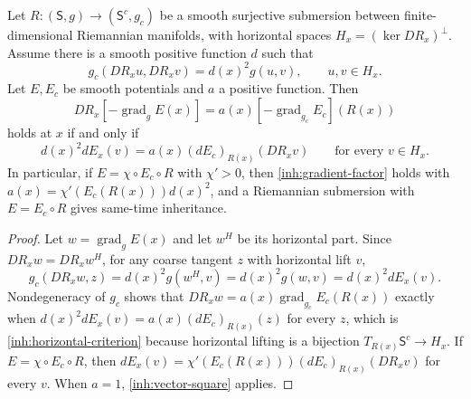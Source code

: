 Let $R:(\mathsf S,g)\to(\mathsf S^c,g_c)$ be a smooth surjective
submersion between finite-dimensional Riemannian manifolds, with horizontal
spaces $H_x=(\ker DR_x)^\perp$. Assume there is a smooth positive function
$d$ such that
\begin{equation}
 g_c(DR_xu,DR_xv)=d(x)^2g(u,v),
 \qquad u,v\in H_x.
 \label{inh:horizontal-conformality}
\end{equation}
Let $E,E_c$ be smooth potentials and $a$ a positive function. Then
\begin{equation}
 DR_x[-\operatorname{grad}_gE(x)]
 =a(x)[-\operatorname{grad}_{g_c}E_c](R(x))
 \label{inh:gradient-factor}
\end{equation}
holds at $x$ if and only if
\begin{equation}
 d(x)^2dE_x(v)=a(x)(dE_c)_{R(x)}(DR_xv)
 \qquad\text{for every }v\in H_x.
 \label{inh:horizontal-criterion}
\end{equation}
In particular, if $E=\chi\circ E_c\circ R$ with $\chi'>0$, then
\cref{inh:gradient-factor} holds with
$a(x)=\chi'(E_c(R(x)))d(x)^2$, and a Riemannian submersion with
$E=E_c\circ R$ gives same-time inheritance.
\begin{proof}
Let $w=\operatorname{grad}_gE(x)$ and let $w^H$ be its horizontal part.
Since $DR_xw=DR_xw^H$, for any coarse tangent $z$ with horizontal lift $v$,
\begin{equation}
 g_c(DR_xw,z)
 =d(x)^2g(w^H,v)
 =d(x)^2g(w,v)
 =d(x)^2dE_x(v).
\end{equation}
Nondegeneracy of $g_c$ shows that $DR_xw=a(x)\operatorname{grad}_{g_c}E_c(R(x))$
exactly when $d(x)^2dE_x(v)=a(x)(dE_c)_{R(x)}(z)$ for every $z$, which is
\cref{inh:horizontal-criterion} because horizontal lifting is a bijection
$T_{R(x)}\mathsf S^c\to H_x$. If $E=\chi\circ E_c\circ R$, then
$dE_x(v)=\chi'(E_c(R(x)))(dE_c)_{R(x)}(DR_xv)$ for every $v$. When $a=1$,
\cref{inh:vector-square} applies.
\end{proof}

